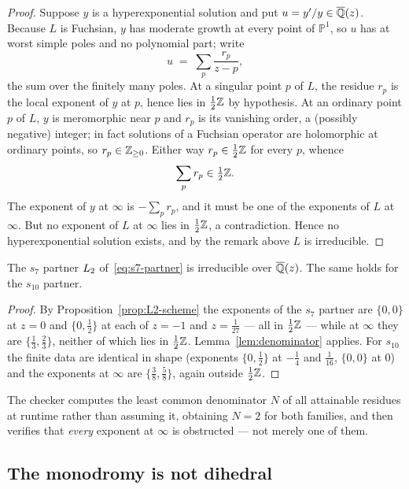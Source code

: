 \begin{proof}
Suppose $y$ is a hyperexponential solution and put $u = y'/y \in
\overline{\mathbb{Q}}(z)$. Because $L$ is Fuchsian, $y$ has moderate growth at every
point of $\mathbb{P}^1$, so $u$ has at worst simple poles and no polynomial
part; write
\[
  u \;=\; \sum_{p} \frac{r_p}{z - p},
\]
the sum over the finitely many poles. At a singular point $p$ of $L$, the
residue $r_p$ is the local exponent of $y$ at $p$, hence lies in
$\tfrac12\mathbb{Z}$ by hypothesis. At an ordinary point $p$ of $L$, $y$ is
meromorphic near $p$ and $r_p$ is its vanishing order, a (possibly negative)
integer; in fact solutions of a Fuchsian operator are holomorphic at ordinary
points, so $r_p \in \mathbb{Z}_{\geq 0}$. Either way $r_p \in \tfrac12\mathbb{Z}$ for every
$p$, whence
\[
  \sum_p r_p \in \tfrac12\mathbb{Z} .
\]
The exponent of $y$ at $\infty$ is $-\sum_p r_p$, and it must be one of the
exponents of $L$ at $\infty$. But no exponent of $L$ at $\infty$ lies in
$\tfrac12\mathbb{Z}$, a contradiction. Hence no hyperexponential solution exists, and
by the remark above $L$ is irreducible.
\end{proof}

\begin{proposition}\label{prop:L2-irred}
The $s_7$ partner $L_2$ of~\eqref{eq:s7-partner} is irreducible over
$\overline{\mathbb{Q}}(z)$. The same holds for the $s_{10}$ partner.
\end{proposition}

\begin{proof}
By Proposition~\ref{prop:L2-scheme} the exponents of the $s_7$ partner are
$\{0,0\}$ at $z=0$ and $\{0,\tfrac12\}$ at each of $z=-1$ and
$z=\tfrac1{27}$ --- all in $\tfrac12\mathbb{Z}$ --- while at $\infty$ they are
$\{\tfrac13,\tfrac23\}$, neither of which lies in $\tfrac12\mathbb{Z}$.
Lemma~\ref{lem:denominator} applies. For $s_{10}$ the finite data are
identical in shape (exponents $\{0,\tfrac12\}$ at $-\tfrac14$ and
$\tfrac1{16}$, $\{0,0\}$ at $0$) and the exponents at $\infty$ are
$\{\tfrac38,\tfrac58\}$, again outside $\tfrac12\mathbb{Z}$.
\end{proof}

The checker computes the least common denominator $N$ of all attainable
residues at runtime rather than assuming it, obtaining $N = 2$ for both
families, and then verifies that \emph{every} exponent at $\infty$ is
obstructed --- not merely one of them.

\subsection{The monodromy is not dihedral}

